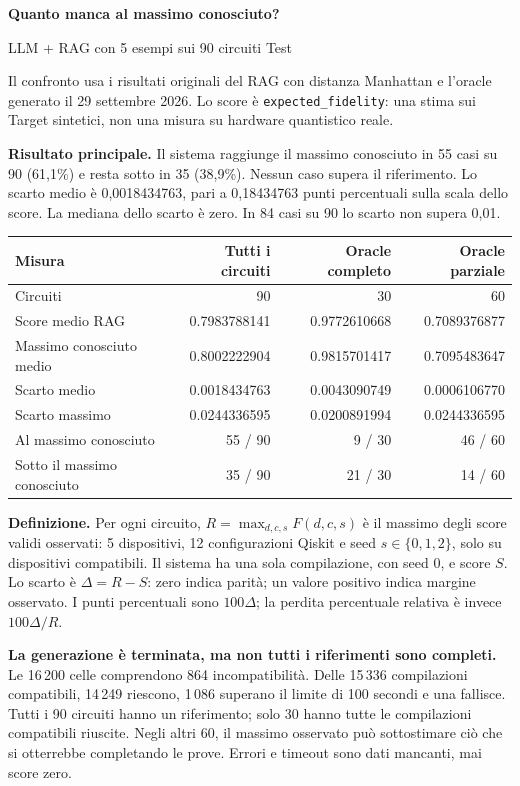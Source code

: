 \documentclass[10pt,a4paper,landscape]{article}
\newcommand{\titolo}[1]{{\Large\bfseries #1}\par\vspace{3mm}}
\begin{document}
\titolo{Quanto manca al massimo conosciuto?}
{\large LLM + RAG con 5 esempi sui 90 circuiti Test}\par
Il confronto usa i risultati originali del RAG con distanza Manhattan e l'oracle
generato il 29 settembre 2026. Lo score è \texttt{expected\_fidelity}:
una stima sui Target sintetici, non una misura su hardware quantistico reale.

\textbf{Risultato principale.} Il sistema raggiunge il massimo conosciuto in
55 casi su 90 (61,1\%) e resta sotto in 35 (38,9\%). Nessun caso supera il riferimento.
Lo scarto medio è 0,0018434763, pari a 0,18434763 punti percentuali sulla scala dello score.
La mediana dello scarto è zero. In 84 casi su 90 lo scarto non supera 0,01.

\begin{tabular}{lrrr}
\toprule
Misura & Tutti i circuiti & Oracle completo & Oracle parziale \\
\midrule
Circuiti & 90 & 30 & 60 \\
Score medio RAG & 0.7983788141 & 0.9772610668 & 0.7089376877 \\
Massimo conosciuto medio & 0.8002222904 & 0.9815701417 & 0.7095483647 \\
Scarto medio & 0.0018434763 & 0.0043090749 & 0.0006106770 \\
Scarto massimo & 0.0244336595 & 0.0200891994 & 0.0244336595 \\
Al massimo conosciuto & 55 / 90 & 9 / 30 & 46 / 60 \\
Sotto il massimo conosciuto & 35 / 90 & 21 / 30 & 14 / 60 \\
\bottomrule
\end{tabular}


\medskip\textbf{Definizione.}
Per ogni circuito, $R=\max_{d,c,s} F(d,c,s)$ è il massimo degli score validi osservati:
5 dispositivi, 12 configurazioni Qiskit e seed $s\in\{0,1,2\}$, solo su dispositivi compatibili.
Il sistema ha una sola compilazione, con seed 0, e score $S$.
Lo scarto è $\Delta=R-S$: zero indica parità; un valore positivo indica margine osservato.
I punti percentuali sono $100\Delta$; la perdita percentuale relativa è invece $100\Delta/R$.

\textbf{La generazione è terminata, ma non tutti i riferimenti sono completi.}
Le 16\,200 celle comprendono 864 incompatibilità. Delle 15\,336 compilazioni compatibili,
14\,249 riescono, 1\,086 superano il limite di 100 secondi e una fallisce.
Tutti i 90 circuiti hanno un riferimento; solo 30 hanno tutte le compilazioni compatibili riuscite.
Negli altri 60, il massimo osservato può sottostimare ciò che si otterrebbe completando le prove.
Errori e timeout sono dati mancanti, mai score zero.
\end{document}
